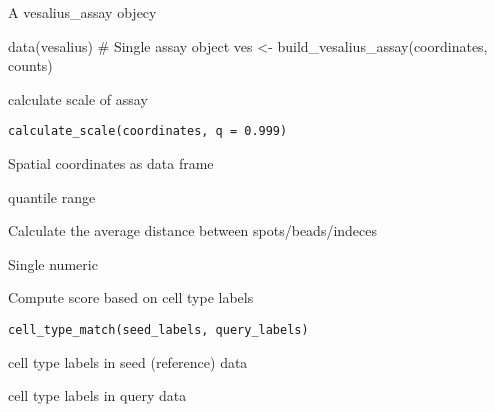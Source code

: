 \documentclass[a4paper]{book}
\begin{document}
%
\begin{Value}
A vesalius\_assay objecy
\end{Value}
%
\begin{Examples}
\begin{ExampleCode}
data(vesalius)
# Single assay object
ves <- build_vesalius_assay(coordinates, counts)
\end{ExampleCode}
\end{Examples}
%
\begin{Description}
calculate scale of assay
\end{Description}
%
\begin{Usage}
\begin{verbatim}
calculate_scale(coordinates, q = 0.999)
\end{verbatim}
\end{Usage}
%
\begin{Arguments}
\begin{ldescription}
\item[\code{coordinates}] Spatial coordinates as data frame

\item[\code{q}] quantile range
\end{ldescription}
\end{Arguments}
%
\begin{Details}
Calculate the average distance between spots/beads/indeces
\end{Details}
%
\begin{Value}
Single numeric
\end{Value}
%
\begin{Description}
Compute score based on cell type labels
\end{Description}
%
\begin{Usage}
\begin{verbatim}
cell_type_match(seed_labels, query_labels)
\end{verbatim}
\end{Usage}
%
\begin{Arguments}
\begin{ldescription}
\item[\code{seed\_labels}] cell type labels in seed (reference) data

\item[\code{query\_labels}] cell type labels in query data
\end{ldescription}
\end{Arguments}
\end{document}
